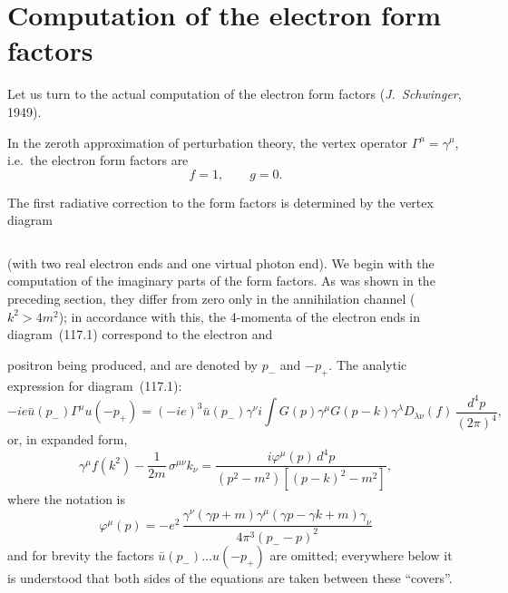 
\section{Computation of the electron form factors}


Let us turn to the actual computation of the electron form factors (\emph{J.~Schwinger}, 1949).

In the zeroth approximation of perturbation theory, the vertex operator $\Gamma^\mu = \gamma^\mu$, i.e.\ the electron form factors are
\[
f = 1, \qquad g = 0.
\]

The first radiative correction to the form factors is determined by the vertex diagram


\begin{equation}
\label{eq:117.1}
\end{equation}

\noindent (with two real electron ends and one virtual photon end). We begin with the computation of the imaginary parts of the form factors. As was shown in the preceding section, they differ from zero only in the annihilation channel ($k^2 > 4m^2$); in accordance with this, the 4-momenta of the electron ends in diagram~(117.1) correspond to the electron and


\noindent positron being produced, and are denoted by $p_-$ and $-p_+$. The analytic expression for diagram~(117.1):
\begin{equation}
-ie\bar{u}(p_-)\Gamma^\mu u(-p_+) =
(-ie)^3\bar{u}(p_-)\gamma^\nu i\!\int G(p)\gamma^\mu G(p - k)\gamma^\lambda D_{\lambda\nu}(f)\,\frac{d^4p}{(2\pi)^4},
\label{eq:117.2}
\end{equation}
or, in expanded form,
\begin{equation}
\gamma^\mu f(k^2) - \frac{1}{2m}\,\sigma^{\mu\nu} k_\nu =
\frac{i\varphi^\mu(p)\,d^4 p}{(p^2 - m^2)[(p - k)^2 - m^2]},
\label{eq:117.3}
\end{equation}
where the notation is
\begin{equation}
\varphi^\mu(p) = -e^2\,\frac{\gamma^\nu(\gamma p + m)\gamma^\mu(\gamma p - \gamma k + m)\gamma_\nu}{4\pi^3(p_- - p)^2}
\label{eq:117.4}
\end{equation}
and for brevity the factors $\bar{u}(p_-) \ldots u(-p_+)$ are omitted; everywhere below it is understood that both sides of the equations are taken between these ``covers''.

